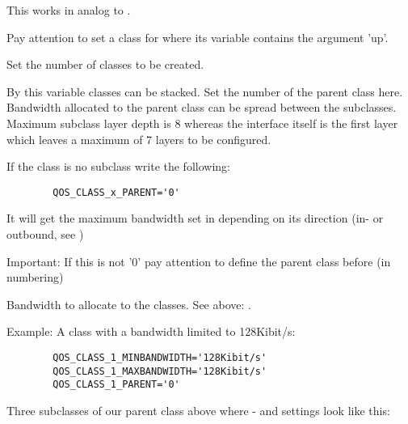 \begin{description}
   This works in analog to .

   Pay attention to set a class for  where
   its  variable contains the argument 'up'.


   Set the number of classes to be created.



   By this variable classes can be stacked. Set the number of the parent
   class here. Bandwidth allocated to the parent class can be spread
   between the subclasses. Maximum subclass layer depth is 8 whereas the
   interface itself is the first layer which leaves a maximum of 7 layers
   to be configured.

   If the class is no subclass write the following:

\begin{example}
\begin{verbatim}
        QOS_CLASS_x_PARENT='0'
\end{verbatim}
\end{example}

   It will get the maximum bandwidth set in 
   depending on its direction (in- or outbound, see )

   Important: If this is not '0' pay attention to define the parent class before
   (in numbering)


   Bandwidth to allocate to the classes.
   See above: .

   Example:
   A class with a bandwidth limited to 128Kibit/s:

\begin{example}
\begin{verbatim}
        QOS_CLASS_1_MINBANDWIDTH='128Kibit/s'
        QOS_CLASS_1_MAXBANDWIDTH='128Kibit/s'
        QOS_CLASS_1_PARENT='0'
\end{verbatim}
\end{example}


   Three subclasses of our parent class above where -
   and  settings look like this:


\end{description}
